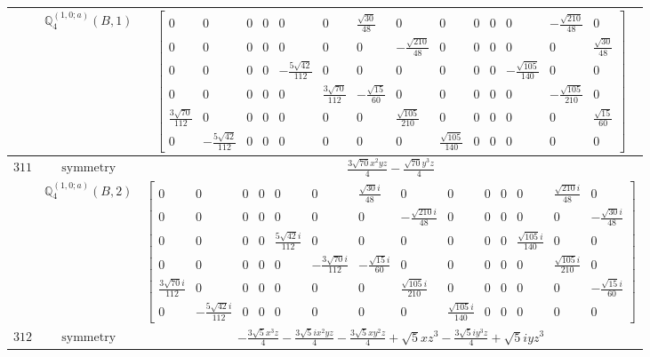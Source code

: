 \documentclass[fleqn,8pt,landscape]{jsarticle}
\begin{document}
\begin{longtable}{ccc}
$  $ & $ \mathbb{Q}_{4}^{(1,0;a)}(B,1) $ & $ \begin{bmatrix} 0 & 0 & 0 & 0 & 0 & 0 & \frac{\sqrt{30}}{48} & 0 & 0 & 0 & 0 & 0 & - \frac{\sqrt{210}}{48} & 0 \\ 0 & 0 & 0 & 0 & 0 & 0 & 0 & - \frac{\sqrt{210}}{48} & 0 & 0 & 0 & 0 & 0 & \frac{\sqrt{30}}{48} \\ 0 & 0 & 0 & 0 & - \frac{5 \sqrt{42}}{112} & 0 & 0 & 0 & 0 & 0 & 0 & - \frac{\sqrt{105}}{140} & 0 & 0 \\ 0 & 0 & 0 & 0 & 0 & \frac{3 \sqrt{70}}{112} & - \frac{\sqrt{15}}{60} & 0 & 0 & 0 & 0 & 0 & - \frac{\sqrt{105}}{210} & 0 \\ \frac{3 \sqrt{70}}{112} & 0 & 0 & 0 & 0 & 0 & 0 & \frac{\sqrt{105}}{210} & 0 & 0 & 0 & 0 & 0 & \frac{\sqrt{15}}{60} \\ 0 & - \frac{5 \sqrt{42}}{112} & 0 & 0 & 0 & 0 & 0 & 0 & \frac{\sqrt{105}}{140} & 0 & 0 & 0 & 0 & 0 \end{bmatrix} $ \\ \hline
$ 311 $ & $ \text{symmetry} $ & $ \frac{3 \sqrt{70} x^{2} y z}{4} - \frac{\sqrt{70} y^{3} z}{4} $ \\
$  $ & $ \mathbb{Q}_{4}^{(1,0;a)}(B,2) $ & $ \begin{bmatrix} 0 & 0 & 0 & 0 & 0 & 0 & \frac{\sqrt{30} i}{48} & 0 & 0 & 0 & 0 & 0 & \frac{\sqrt{210} i}{48} & 0 \\ 0 & 0 & 0 & 0 & 0 & 0 & 0 & - \frac{\sqrt{210} i}{48} & 0 & 0 & 0 & 0 & 0 & - \frac{\sqrt{30} i}{48} \\ 0 & 0 & 0 & 0 & \frac{5 \sqrt{42} i}{112} & 0 & 0 & 0 & 0 & 0 & 0 & \frac{\sqrt{105} i}{140} & 0 & 0 \\ 0 & 0 & 0 & 0 & 0 & - \frac{3 \sqrt{70} i}{112} & - \frac{\sqrt{15} i}{60} & 0 & 0 & 0 & 0 & 0 & \frac{\sqrt{105} i}{210} & 0 \\ \frac{3 \sqrt{70} i}{112} & 0 & 0 & 0 & 0 & 0 & 0 & \frac{\sqrt{105} i}{210} & 0 & 0 & 0 & 0 & 0 & - \frac{\sqrt{15} i}{60} \\ 0 & - \frac{5 \sqrt{42} i}{112} & 0 & 0 & 0 & 0 & 0 & 0 & \frac{\sqrt{105} i}{140} & 0 & 0 & 0 & 0 & 0 \end{bmatrix} $ \\ \hline
$ 312 $ & $ \text{symmetry} $ & $ - \frac{3 \sqrt{5} x^{3} z}{4} - \frac{3 \sqrt{5} i x^{2} y z}{4} - \frac{3 \sqrt{5} x y^{2} z}{4} + \sqrt{5} x z^{3} - \frac{3 \sqrt{5} i y^{3} z}{4} + \sqrt{5} i y z^{3} $ \\

\end{longtable}
\end{document}
